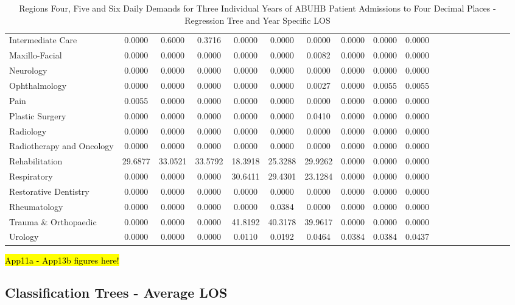 \documentclass[thesis.tex]{subfiles}
\begin{document}
\begin{landscape}
\begin{table}[h!]
{\begin{tabular}{lcccccccccccccccccc}
Intermediate Care&	0.0000&	0.6000&	0.3716&	0.0000&	0.0000&	0.0000&	0.0000&	0.0000&	0.0000\\
Maxillo-Facial&	0.0000&	0.0000&	0.0000&	0.0000&	0.0000&	0.0082&	0.0000&	0.0000&	0.0000\\
Neurology&	0.0000&	0.0000&	0.0000&	0.0000&	0.0000&	0.0000&	0.0000&	0.0000&	0.0000\\
Ophthalmology&	0.0000&	0.0000&	0.0000&	0.0000&	0.0000&	0.0027&	0.0000&	0.0055&	0.0055\\
Pain&	0.0055&	0.0000&	0.0000&	0.0000&	0.0000&	0.0000&	0.0000&	0.0000&	0.0000\\
Plastic Surgery&	0.0000&	0.0000&	0.0000&	0.0000&	0.0000&	0.0410&	0.0000&	0.0000&	0.0000\\
Radiology&	0.0000&	0.0000&	0.0000&	0.0000&	0.0000&	0.0000&	0.0000&	0.0000&	0.0000\\
Radiotherapy and Oncology&	0.0000&	0.0000&	0.0000&	0.0000&	0.0000&	0.0000&	0.0000&	0.0000&	0.0000\\
Rehabilitation&	29.6877&	33.0521&	33.5792&	18.3918&	25.3288&	29.9262&	0.0000&	0.0000&	0.0000\\
Respiratory&	0.0000&	0.0000&	0.0000&	30.6411&	29.4301&	23.1284&	0.0000&	0.0000&	0.0000\\
Restorative Dentistry&	0.0000&	0.0000&	0.0000&	0.0000&	0.0000&	0.0000&	0.0000&	0.0000&	0.0000\\
Rheumatology&	0.0000&	0.0000&	0.0000&	0.0000&	0.0384&	0.0000&	0.0000&	0.0000&	0.0000\\
Trauma \& Orthopaedic&	0.0000&	0.0000&	0.0000&	41.8192&	40.3178&	39.9617&	0.0000&	0.0000&	0.0000\\
Urology&	0.0000&	0.0000&	0.0000&	0.0110&	0.0192&	0.0464&	0.0384&	0.0384&	0.0437\\

\bottomrule
\end{tabular}} 
\caption{Regions Four, Five and Six Daily Demands for Three Individual Years of ABUHB Patient Admissions to Four Decimal Places - Regression Tree and Year Specific LOS}
    \label{apptab:LinkedDemands5a}
\end{table}

\end{landscape}
\hl{App11a - App13b figures here!}

\subsection{Classification Trees - Average LOS}
\end{document}

